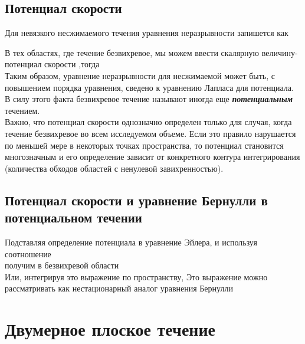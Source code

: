 \documentclass[
]{article}
\begin{document}
\subsection{Потенциал
скорости}\label{ux43fux43eux442ux435ux43dux446ux438ux430ux43b-ux441ux43aux43eux440ux43eux441ux442ux438}

Для невязкого несжимаемого течения уравнения неразрывности запишется как
{}

В тех областях, где течение безвихревое, мы можем ввести скалярную
величину- потенциал скорости {} ,тогда\\
{}Таким образом, уравнение неразрывности для несжимаемой может быть, с
повышением порядка уравнения, сведено к уравнению Лапласа для
потенциала.\\
В силу этого факта безвихревое течение называют иногда еще
\textbf{\emph{потенциальным}} течением.\\
Важно, что потенциал скорости однозначно определен только для случая,
когда течение безвихревое во всем исследуемом объеме. Если это правило
нарушается по меньшей мере в некоторых точках пространства, то потенциал
становится многозначным и его определение зависит от конкретного контура
интегрирования (количества обходов областей с ненулевой завихренностью).

\subsection{Потенциал скорости и уравнение Бернулли в потенциальном
течении}\label{ux43fux43eux442ux435ux43dux446ux438ux430ux43b-ux441ux43aux43eux440ux43eux441ux442ux438-ux438-ux443ux440ux430ux432ux43dux435ux43dux438ux435-ux431ux435ux440ux43dux443ux43bux43bux438-ux432-ux43fux43eux442ux435ux43dux446ux438ux430ux43bux44cux43dux43eux43c-ux442ux435ux447ux435ux43dux438ux438}

Подставляя определение потенциала в уравнение Эйлера, и используя
соотношение\\
{}получим в безвихревой области\\
{}Или, интегрируя это выражение по пространству, {}Это выражение можно
рассматривать как нестационарный аналог уравнения Бернулли

\section{Двумерное плоское
течение}\label{ux434ux432ux443ux43cux435ux440ux43dux43eux435-ux43fux43bux43eux441ux43aux43eux435-ux442ux435ux447ux435ux43dux438ux435}
\end{document}
